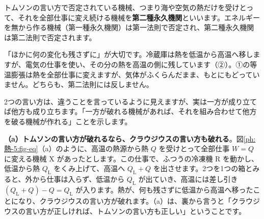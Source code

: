 トムソンの言い方で否定されている機械、つまり海や空気の熱だけを受けとって、それを全部仕事に変え続ける機械を\textbf{第二種永久機関}といいます。エネルギーを無から作る機械（第一種永久機関）は第一法則で否定され、第二種永久機関は第二法則で否定されます。

「ほかに何の変化も残さずに」が大切です。冷蔵庫は熱を低温から高温へ移しますが、電気の仕事を使い、その分の熱を高温の側に残しています（②）。①の等温膨張は熱を全部仕事に変えますが、気体がふくらんだまま、もとにもどっていません。どちらも、第二法則には反しません。

2つの言い方は、違うことを言っているように見えますが、実は一方が成り立てば他方も成り立ちます。「一方が破れる機械があれば、それを組み合わせて他方を破る機械が作れる」ことを示します。

\textbf{（a）トムソンの言い方が破れるなら、クラウジウスの言い方も破れる}。図\ref{ph:熱-5:fig-eq}（a）のように、高温の熱源から熱 $Q$ を受けとって全部仕事 $W=Q$ に変える機械 X があったとします。この仕事で、ふつうの冷凍機 R を動かし、低温から熱 $Q_{\mathrm L}$ をくみ上げて、高温へ $Q_{\mathrm L}+Q$ を出させます。2つを1つの箱とみると、外から仕事は入らず、低温から $Q_{\mathrm L}$ が出ていき、高温には差し引き $(Q_{\mathrm L}+Q)-Q=Q_{\mathrm L}$ が入ります。熱が、何も残さずに低温から高温へ移ったことになり、クラウジウスの言い方が破れます。（a）は、裏から言うと「クラウジウスの言い方が正しければ、トムソンの言い方も正しい」ということです。

